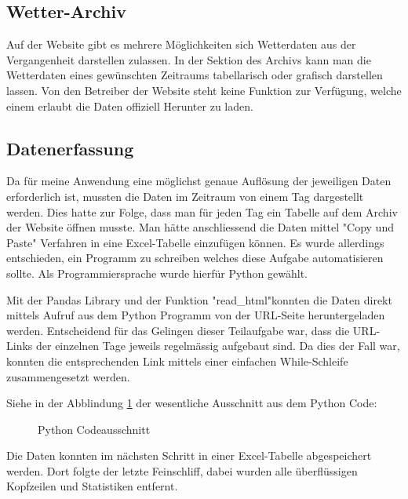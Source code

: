 \begin{refsection}
\subsection{Wetter-Archiv}
Auf der Website gibt es mehrere Möglichkeiten sich Wetterdaten aus der Vergangenheit darstellen zulassen.
In der Sektion des Archivs kann man die Wetterdaten eines gew\"unschten Zeitraums tabellarisch oder grafisch darstellen lassen.
Von den Betreiber der Website steht keine Funktion zur Verfügung, welche einem erlaubt die Daten offiziell Herunter zu laden.
\subsection{Datenerfassung}
Da f\"ur meine Anwendung eine m\"oglichst genaue Aufl\"osung der jeweiligen Daten erforderlich ist, mussten die Daten im Zeitraum von einem Tag dargestellt werden.
Dies hatte zur Folge, dass man f\"ur jeden Tag ein Tabelle auf dem Archiv der Website \"offnen musste. Man hätte anschliessend die Daten mittel "Copy und Paste" Verfahren in eine Excel-Tabelle einzuf\"ugen können. Es wurde allerdings entschieden, ein Programm zu schreiben welches diese Aufgabe automatisieren sollte.
Als Programmiersprache wurde hierf\"ur Python gewählt.


Mit der Pandas Library und der Funktion "read\_html"\space konnten die Daten direkt mittels Aufruf aus dem Python Programm von der URL-Seite heruntergeladen werden.
Entscheidend für das Gelingen dieser Teilaufgabe war, dass die URL-Links der einzelnen Tage jeweils regelmässig aufgebaut sind.
Da dies der Fall war, konnten die entsprechenden Link mittels einer einfachen While-Schleife zusammengesetzt werden.

Siehe in der Abblindung \ref{fig:python-code} der wesentliche Ausschnitt aus dem Python Code:
\begin{figure}
	\centering
	
	\caption{Python Codeausschnitt}
	\label{fig:python-code}
\end{figure}

Die Daten konnten im nächsten Schritt in einer Excel-Tabelle abgespeichert werden.
Dort folgte der letzte Feinschliff, dabei wurden alle überflüssigen Kopfzeilen und Statistiken entfernt.


\end{refsection}
